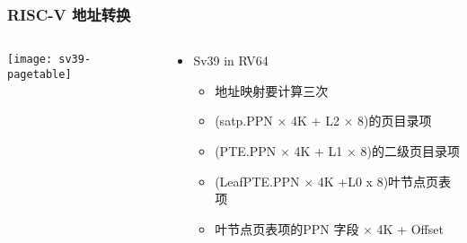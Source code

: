 %	
%		
%			
%		
%		
%			
%			
%		
%		


\begin{frame} 
	\frametitle{RISC-V 地址转换}
	
	\begin{columns}
		
		\begin{column}{.4\textwidth}
			
			\texttt{[image: sv39-pagetable]}
			
		\end{column}
		
		
		\begin{column}{.6\textwidth}
			
			\begin{itemize}
				\item Sv39 in RV64 
				\begin{itemize}\small
				 	\item 地址映射要计算三次
					\item (satp.PPN × 4K + L2 × 8)的页目录项
					\item (PTE.PPN × 4K + L1 × 8)的二级页目录项
					\item (LeafPTE.PPN × 4K +L0 x 8)叶节点页表项
					\item 叶节点页表项的PPN 字段 × 4K + Offset
					
				\end{itemize}
			\end{itemize}
			
			
			
		\end{column}
		
		
	\end{columns}
\end{frame}



